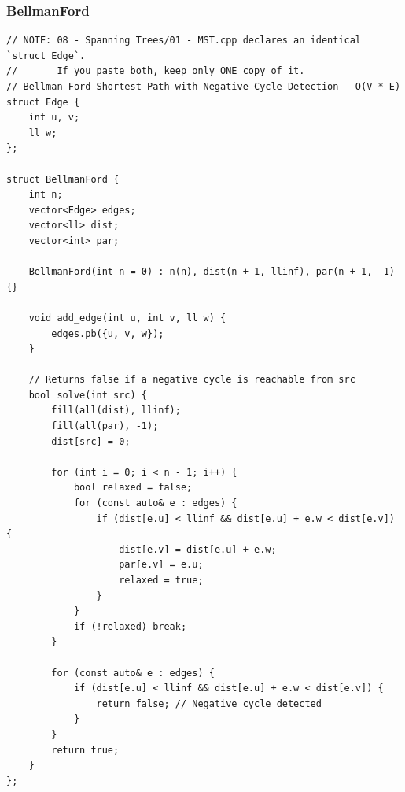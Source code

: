 \documentclass[9pt,a4paper,twocolumn]{extarticle}
\begin{document}
\filbreak
\subsubsection{BellmanFord}
\nopagebreak
\begin{lstlisting}
// NOTE: 08 - Spanning Trees/01 - MST.cpp declares an identical `struct Edge`.
//       If you paste both, keep only ONE copy of it.
// Bellman-Ford Shortest Path with Negative Cycle Detection - O(V * E)
struct Edge {
    int u, v;
    ll w;
};

struct BellmanFord {
    int n;
    vector<Edge> edges;
    vector<ll> dist;
    vector<int> par;

    BellmanFord(int n = 0) : n(n), dist(n + 1, llinf), par(n + 1, -1) {}

    void add_edge(int u, int v, ll w) {
        edges.pb({u, v, w});
    }

    // Returns false if a negative cycle is reachable from src
    bool solve(int src) {
        fill(all(dist), llinf);
        fill(all(par), -1);
        dist[src] = 0;

        for (int i = 0; i < n - 1; i++) {
            bool relaxed = false;
            for (const auto& e : edges) {
                if (dist[e.u] < llinf && dist[e.u] + e.w < dist[e.v]) {
                    dist[e.v] = dist[e.u] + e.w;
                    par[e.v] = e.u;
                    relaxed = true;
                }
            }
            if (!relaxed) break;
        }

        for (const auto& e : edges) {
            if (dist[e.u] < llinf && dist[e.u] + e.w < dist[e.v]) {
                return false; // Negative cycle detected
            }
        }
        return true;
    }
};
\end{lstlisting}

\filbreak
\end{document}
